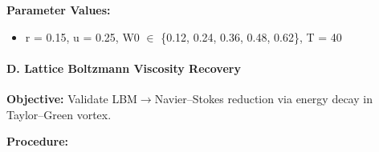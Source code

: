 \documentclass[
]{article}
\providecommand{\tightlist}{%
  \setlength{\itemsep}{0pt}\setlength{\parskip}{0pt}}
\begin{document}
\textbf{Parameter Values:}

\begin{itemize}
\tightlist
\item
  r = 0.15, u = 0.25, W0 $\in$ \{0.12, 0.24, 0.36, 0.48, 0.62\}, T = 40
\end{itemize}

\hypertarget{d.-lattice-boltzmann-viscosity-recovery}{%
\paragraph{D. Lattice Boltzmann Viscosity
Recovery}\label{d.-lattice-boltzmann-viscosity-recovery}}

\textbf{Objective:} Validate LBM$\rightarrow$Navier--Stokes reduction via energy
decay in Taylor--Green vortex.

\textbf{Procedure:}
\end{document}
